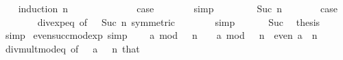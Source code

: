 \begin{isabellebody}
\ \ \isamarkupfalse%
\ {\isacharparenleft}{\kern0pt}induction\ n{\isacharparenright}{\kern0pt}\isanewline
\ \ \ \ \isamarkupfalse%
\ {}\isanewline
\ \ \ \ \isamarkupfalse%
\ \isamarkupfalse%
\ {\isacharquery}{\kern0pt}case\isanewline
\ \ \ \ \ \ \isamarkupfalse%
\ simp\isanewline
\ \ \isamarkupfalse%
\isanewline
\ \ \ \ \isamarkupfalse%
\ {\isacharparenleft}{\kern0pt}Suc\ n{\isacharparenright}{\kern0pt}\isanewline
\ \ \ \ \isamarkupfalse%
\ \isamarkupfalse%
\ {\isacharquery}{\kern0pt}case\isanewline
\ \ \ \ \ \ \isamarkupfalse%
\ div{\isacharunderscore}{\kern0pt}exp{\isacharunderscore}{\kern0pt}eq\ {\isacharbrackleft}{\kern0pt}of\ {\isacharunderscore}{\kern0pt}\ {}\ {\isacartoucheopen}Suc\ n{\isacartoucheclose}{\isacharcomma}{\kern0pt}\ symmetric{\isacharbrackright}{\kern0pt}\isanewline
\ \ \ \ \ \ \isamarkupfalse%
\ simp\isanewline
\ \ \isamarkupfalse%
\isanewline
\ \ \isamarkupfalse%
\ Suc\ \isamarkupfalse%
\ {\isacharquery}{\kern0pt}thesis\isanewline
\ \ \ \ \isamarkupfalse%
\ simp\isanewline
{}\isamarkupfalse%
%
\endisatagproof
{\isafoldproof}%
%
\isadelimproof
\isanewline
%
\endisadelimproof
\isanewline
{}\isamarkupfalse%
\ even{\isacharunderscore}{\kern0pt}succ{\isacharunderscore}{\kern0pt}mod{\isacharunderscore}{\kern0pt}exp\ {\isacharbrackleft}{\kern0pt}simp{\isacharbrackright}{\kern0pt}{\isacharcolon}{\kern0pt}\isanewline
\ \ {\isacartoucheopen}{\isacharparenleft}{\kern0pt}{}\ {\isacharplus}{\kern0pt}\ a{\isacharparenright}{\kern0pt}\ mod\ {}\ {\isacharcircum}{\kern0pt}\ n\ {\isacharequal}{\kern0pt}\ {}\ {\isacharplus}{\kern0pt}\ {\isacharparenleft}{\kern0pt}a\ mod\ {}\ {\isacharcircum}{\kern0pt}\ n{\isacharparenright}{\kern0pt}{\isacartoucheclose}\ \ {\isacartoucheopen}even\ a{\isacartoucheclose}\ \ {\isacartoucheopen}n\ {\isachargreater}{\kern0pt}\ {}{\isacartoucheclose}\isanewline
%
\isadelimproof
\ \ %
\endisadelimproof
%
\isatagproof
{}\isamarkupfalse%
\ div{\isacharunderscore}{\kern0pt}mult{\isacharunderscore}{\kern0pt}mod{\isacharunderscore}{\kern0pt}eq\ {\isacharbrackleft}{\kern0pt}of\ {\isacartoucheopen}{}\ {\isacharplus}{\kern0pt}\ a{\isacartoucheclose}\ {\isacartoucheopen}{}\ {\isacharcircum}{\kern0pt}\ n{\isacartoucheclose}{\isacharbrackright}{\kern0pt}\ that\isanewline

\end{isabellebody}
